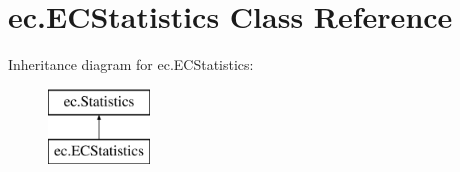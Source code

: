 \hypertarget{classec_1_1_e_c_statistics}{}\section{ec.\+E\+C\+Statistics Class Reference}
\label{classec_1_1_e_c_statistics}
Inheritance diagram for ec.\+E\+C\+Statistics\+:\begin{figure}[H]
\begin{center}
\leavevmode
\includegraphics[height=2.000000cm]{classec_1_1_e_c_statistics}
\end{center}
\end{figure}

